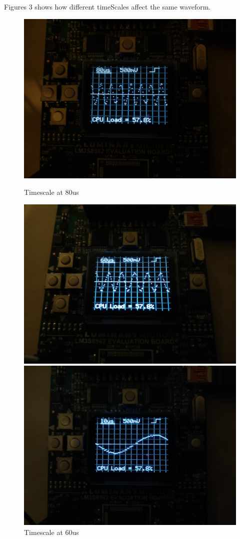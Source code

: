 \documentclass[12pt,oneside,letterpaper]{article}
\begin{document}
Figures 3 shows how different timeScales affect the same waveform.
\begin{figure}[!h]
  \includegraphics[width=\linewidth]{assets/wave_2.jpg}
  \caption{Timescale at 80us}\label{fig:awesome_image1}
\endminipage\hfill
{}
  \includegraphics[width=\linewidth]{assets/wave_1.jpg}
  \caption{Timescale at 60us}\label{fig:awesome_image2}
\endminipage\hfill
{}%
  \includegraphics[width=\linewidth]{assets/wave_3.jpg}

\end{figure}
\end{document}
